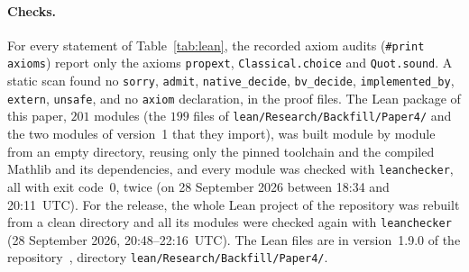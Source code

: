 \documentclass[11pt]{article}
\theoremstyle{remark}
\newcommand{\repoversion}{1.9.0}
\begin{document}
\paragraph{Checks.}
For every statement of Table~\ref{tab:lean}, the recorded axiom audits
(\texttt{\#print axioms}) report only the axioms \texttt{propext},
\texttt{Classical.choice} and \texttt{Quot.sound}. A static scan found no
\texttt{sorry}, \texttt{admit}, \texttt{native\_decide},
\texttt{bv\_decide}, \texttt{implemented\_by}, \texttt{extern},
\texttt{unsafe}, and no \texttt{axiom} declaration, in the proof files.
The Lean package of
this paper, $201$ modules (the $199$ files of
\texttt{lean/Research/Backfill/Paper4/} and the two modules of version~1 that
they import), was built module by module from an empty
directory, reusing only the pinned toolchain and the compiled Mathlib and
its dependencies, and every module was checked with \texttt{leanchecker},
all with exit code~$0$, twice (on 28 September 2026 between 18:34 and
20:11~UTC). For the release, the whole Lean project of the repository was
rebuilt from a clean directory and all its modules were checked again with
\texttt{leanchecker} (28 September 2026, 20:48--22:16~UTC). The Lean files
are in
version~\repoversion{} of the repository~\cite{repo}, directory
\texttt{lean/Research/Backfill/Paper4/}.
\end{document}

